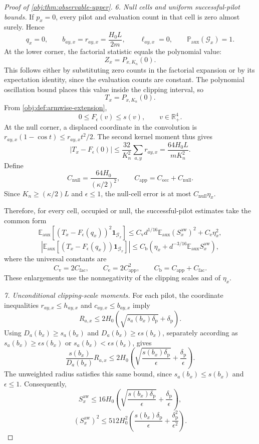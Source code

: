 \documentclass[11pt]{article}
\begin{document}
\begin{proof}[Proof of \cref{obj:thm:observable-upper}]
\textit{6. Null cells and uniform successful-pilot bounds.}
If \(p_x=0\), every pilot and evaluation count in that cell is zero almost surely. Hence
\[
q_x=0,\qquad
b_{ay,x}=r_{ay,x}=\frac{H_0L}{2m},\qquad
\ell_{ay,x}=0,
\qquad
\mathbb P_{\mathrm{aux}}(\mathcal G_x)=1.
\]
At the lower corner, the factorial statistic equals the polynomial value:
\[
Z_x=P_{x,K_n}(0).
\]
This follows either by substituting zero counts in the factorial expansion or by its expectation identity, since the evaluation counts are constant. The polynomial oscillation bound places this value inside the clipping interval, so
\[
T_x=P_{x,K_n}(0).
\]
From \cref{obj:def:armwise-extension},
\[
0\le F_\epsilon(v)\le s(v),\qquad v\in\mathbb R_+^4.
\]
At the null corner, a displaced coordinate in the convolution is
\(r_{ay,x}(1-\cos t)\le r_{ay,x}t^2/2\). The second kernel moment thus gives
\[
|T_x-F_\epsilon(0)|
\le\frac{32}{K_n^2}\sum_{a,y}r_{ay,x}
=\frac{64H_0L}{mK_n^2}.
\]
Define
\[
C_{\mathrm{null}}=\frac{64H_0}{(\kappa/2)^2},
\qquad
C_{\mathrm{app}}=C_{\mathrm{occ}}+C_{\mathrm{null}}.
\]
Since \(K_n\ge(\kappa/2)L\) and \(\epsilon\le1\), the null-cell error is at most \(C_{\mathrm{null}}\eta_x\).

Therefore, for every cell, occupied or null, the successful-pilot estimates take the common form
\[
\mathbb E_{\mathrm{aux}}
[(T_x-F_\epsilon(q_x))^2\mathbf1_{\mathcal G_x}]
\le
C_{\mathrm v}d^{1/16}
\mathbb E_{\mathrm{aux}}(S_x^{\mathrm{aw}})^2
+C_{\mathrm e}\eta_x^2,
\]
\[
\left|
\mathbb E_{\mathrm{aux}}
[(T_x-F_\epsilon(q_x))\mathbf1_{\mathcal G_x}]
\right|
\le
C_{\mathrm b}
\left(\eta_x+d^{-3/16}\mathbb E_{\mathrm{aux}}S_x^{\mathrm{aw}}\right),
\]
where the universal constants are
\[
C_{\mathrm v}=2C_{\mathrm{fac}},\qquad
C_{\mathrm e}=2C_{\mathrm{app}}^2,\qquad
C_{\mathrm b}=C_{\mathrm{app}}+C_{\mathrm{fac}}.
\]
These enlargements use the nonnegativity of the clipping scales and of \(\eta_x\).

\textit{7. Unconditional clipping-scale moments.}
For each pilot, the coordinate inequalities \(r_{ay,x}\le h_{ay,x}\) and \(c_{ay,x}\le b_{ay,x}\) imply
\[
R_{a,x}
\le2H_0\left(\sqrt{s_a(b_x)\delta_{\mathrm p}}+\delta_{\mathrm p}\right).
\]
Using \(D_a(b_x)\ge s_a(b_x)\) and
\(D_a(b_x)\ge\epsilon s(b_x)\), separately according as
\(s_a(b_x)\ge\epsilon s(b_x)\) or
\(s_a(b_x)<\epsilon s(b_x)\), gives
\[
\frac{s(b_x)}{D_a(b_x)}R_{a,x}
\le
2H_0\left(
\sqrt{\frac{s(b_x)\delta_{\mathrm p}}{\epsilon}}
+\frac{\delta_{\mathrm p}}{\epsilon}
\right).
\]
The unweighted radius satisfies this same bound, since
\(s_a(b_x)\le s(b_x)\) and \(\epsilon\le1\). Consequently,
\[
S_x^{\mathrm{aw}}
\le16H_0\left(
\sqrt{\frac{s(b_x)\delta_{\mathrm p}}{\epsilon}}
+\frac{\delta_{\mathrm p}}{\epsilon}
\right),
\]
\[
(S_x^{\mathrm{aw}})^2
\le512H_0^2\left(
\frac{s(b_x)\delta_{\mathrm p}}{\epsilon}
+\frac{\delta_{\mathrm p}^2}{\epsilon^2}
\right).
\]


\end{proof}
\end{document}
